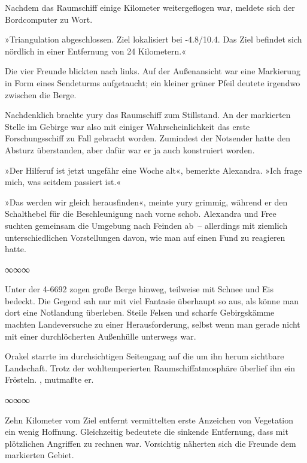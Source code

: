 Nachdem das Raumschiff einige Kilometer weitergeflogen war, meldete sich der Bordcomputer zu Wort.

»Triangulation abgeschlossen. Ziel lokalisiert bei -4.8/10.4. Das Ziel befindet sich nördlich in einer Entfernung von 24 Kilometern.«

Die vier Freunde blickten nach links. Auf der Außenansicht war eine Markierung in Form eines Sendeturms aufgetaucht; ein kleiner grüner Pfeil deutete irgendwo zwischen die Berge.

Nachdenklich brachte yury das Raumschiff zum Stillstand. An der markierten Stelle im Gebirge war also mit einiger Wahrscheinlichkeit das erste Forschungsschiff zu Fall gebracht worden. Zumindest der Notsender hatte den Absturz überstanden, aber dafür war er ja auch konstruiert worden.

»Der Hilferuf ist jetzt ungefähr eine Woche alt«, bemerkte Alexandra. »Ich frage mich, was seitdem passiert ist.«

»Das werden wir gleich herausfinden«, meinte yury grimmig, während er den Schalthebel für die Beschleunigung nach vorne schob. Alexandra und Free suchten gemeinsam die Umgebung nach Feinden ab~– allerdings mit ziemlich unterschiedlichen Vorstellungen davon, wie man auf einen Fund zu reagieren hatte.

\begin{center}
    ∞∞∞
\end{center}

Unter der 4-6692 zogen große Berge hinweg, teilweise mit Schnee und Eis bedeckt. Die Gegend sah nur mit viel Fantasie überhaupt so aus, als könne man dort eine Notlandung überleben. Steile Felsen und scharfe Gebirgskämme machten Landeversuche zu einer Herausforderung, selbst wenn man gerade nicht mit einer durchlöcherten Außenhülle unterwegs war.

Orakel starrte im durchsichtigen Seitengang auf die um ihn herum sichtbare Landschaft. Trotz der wohltemperierten Raumschiffatmosphäre überlief ihn ein Frösteln. , mutmaßte er.

\begin{center}
    ∞∞∞
\end{center}

Zehn Kilometer vom Ziel entfernt vermittelten erste Anzeichen von Vegetation ein wenig Hoffnung. Gleichzeitig bedeutete die sinkende Entfernung, dass mit plötzlichen Angriffen zu rechnen war. Vorsichtig näherten sich die Freunde dem markierten Gebiet.

